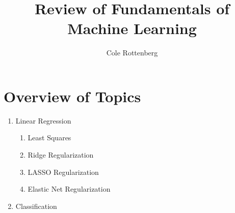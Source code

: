 \documentclass[12pt]{article}
\begin{document}
\title{Review of Fundamentals of Machine Learning}
\author{Cole Rottenberg}

\maketitle

\section*{Overview of Topics}
\begin{enumerate}
  \item Linear Regression
  \begin{enumerate}
    \item Least Squares
    \item Ridge Regularization
    \item LASSO Regularization
    \item Elastic Net Regularization
  \end{enumerate}
  \item Classification
\end{enumerate}
\end{document}
